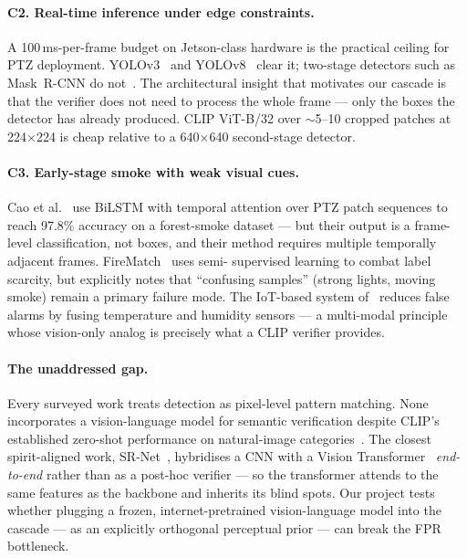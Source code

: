 \documentclass{article}
\begin{document}
\paragraph{C2. Real-time inference under edge constraints.}
A 100\,ms-per-frame budget on Jetson-class hardware is the practical
ceiling for PTZ deployment. YOLOv3~\cite{cnn_fire_detection} and
YOLOv8~\cite{yolov8_smartcity} clear it; two-stage detectors such as
Mask~R-CNN do not~\cite{detectron2fire}. The architectural insight that
motivates our cascade is that the verifier does not need to process the whole
frame --- only the boxes the detector has already produced. CLIP ViT-B/32 over
$\sim$5--10 cropped patches at 224$\times$224 is cheap relative to a
640$\times$640 second-stage detector.

\paragraph{C3. Early-stage smoke with weak visual cues.}
Cao et al.~\cite{bilstm_smoke} use BiLSTM with temporal attention over PTZ
patch sequences to reach 97.8\% accuracy on a forest-smoke dataset --- but their
output is a frame-level classification, not boxes, and their method requires
multiple temporally adjacent frames. FireMatch~\cite{firematch} uses semi-
supervised learning to combat label scarcity, but explicitly notes that
``confusing samples'' (strong lights, moving smoke) remain a primary failure
mode. The IoT-based system of~\cite{iot_nodefire} reduces false alarms by
fusing temperature and humidity sensors --- a multi-modal principle whose
vision-only analog is precisely what a CLIP verifier provides.

\paragraph{The unaddressed gap.}
Every surveyed work treats detection as pixel-level pattern matching. None
incorporates a vision-language model for semantic verification despite CLIP's
established zero-shot performance on natural-image categories~\cite{clip}.
The closest spirit-aligned work, SR-Net~\cite{cnn_vit_smoke}, hybridises a
CNN with a Vision Transformer~\cite{vit} \emph{end-to-end} rather than as a
post-hoc verifier --- so the transformer attends to the same features as the
backbone and inherits its blind spots. Our project tests whether plugging a
frozen, internet-pretrained vision-language model into the cascade --- as an
explicitly orthogonal perceptual prior --- can break the FPR bottleneck.
\end{document}
